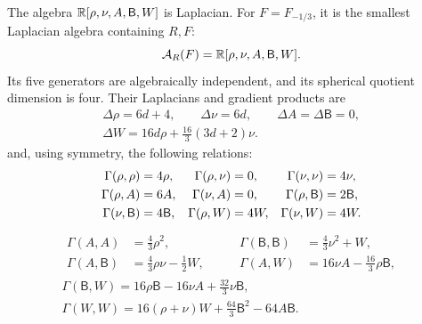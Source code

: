 \begin{proposition}
\label{prop:nonradial-algebra}
The algebra \(\mathbb R[\rho,\nu,A,\mathsf B,W]\) is Laplacian. For
\(F=F_{-1/3}\), it is the smallest Laplacian algebra containing
\(R,F\):
\[
 \mathcal A_R(F)=\mathbb R[\rho,\nu,A,\mathsf{B},W].
\]
Its five generators are algebraically independent, and its spherical
quotient dimension is four. Their Laplacians and gradient products are
\begin{equation}\label{eq:nonradial-laplacians}
 \begin{gathered}
 \Delta\rho=6d+4,\qquad\Delta\nu=6d,\qquad
 \Delta A=\Delta \mathsf{B}=0,\\
 \Delta W=16d\rho+\tfrac{16}{3}(3d+2)\nu.
 \end{gathered}
\end{equation}
and, using symmetry, the following relations:
\begin{align}
 \Gamma(\rho,\rho)&=4\rho,&\Gamma(\rho,\nu)&=0,
       &\Gamma(\nu,\nu)&=4\nu,\notag\\
 \Gamma(\rho,A)&=6A,&\Gamma(\nu,A)&=0,
       &\Gamma(\rho,\mathsf{B})&=2\mathsf{B},\notag\\
 \Gamma(\nu,\mathsf{B})&=4\mathsf{B},&\Gamma(\rho,W)&=4W,
       &\Gamma(\nu,W)&=4W.\label{eq:nonradial-quadratic-pairings}
\end{align}
\begin{equation}\label{eq:nonradial-closure}
\begin{gathered}
 \begin{aligned}
 \Gamma(A,A)&=\tfrac43\rho^2,
 &\qquad\Gamma(\mathsf{B},\mathsf{B})&=\tfrac43\nu^2+W,\\
 \Gamma(A,\mathsf{B})&=\tfrac43\rho\nu-\tfrac12W,
 &\qquad\Gamma(A,W)&=16\nu A-\tfrac{16}{3}\rho \mathsf{B},
 \end{aligned}\\
 \Gamma(\mathsf{B},W)=16\rho \mathsf{B}-16\nu A+\tfrac{32}{3}\nu \mathsf{B},\\
 \Gamma(W,W)=16(\rho+\nu)W+\tfrac{64}{3}\mathsf{B}^2-64A\mathsf{B}.
\end{gathered}
\end{equation}
\end{proposition}

